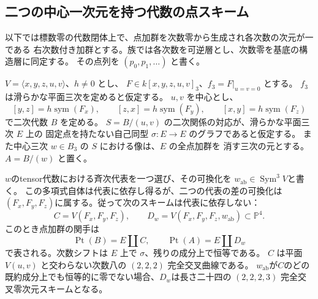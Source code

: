 \subsection{二つの中心一次元を持つ代数の点スキーム}
\label{subsec:point-central-two}

以下では標数零の代数閉体上で、点加群を次数零から生成され各次数の次元が一である
右次数付き加群とする。族では各次数を可逆層とし、次数零を基底の構造層に同定する。
その点列を $(p_0,p_1,\ldots)$ と書く。

\begin{proposition}[楕円曲線と定常点の分離]
\label{prop:central-two-point-scheme}
$V=\langle x,y,z,u,v\rangle$、$h\ne0$ とし、
$F\in k[x,y,z,u,v]_3$、$f_3=F|_{u=v=0}$ とする。
$f_3$ は滑らかな平面三次を定めると仮定する。
$u,v$ を中心とし、
\[
 [y,z]=h\operatorname{sym}(F_x),\qquad
 [z,x]=h\operatorname{sym}(F_y),\qquad
 [x,y]=h\operatorname{sym}(F_z)
\]
で二次代数 $B$ を定める。
$S=B/(u,v)$ の二次関係の対応が、滑らかな平面三次 $E$ 上の
固定点を持たない自己同型 $\sigma:E\to E$ のグラフであると仮定する。
また中心三次 $w\in B_3$ の $S$ における像は、$E$ の全点加群を
消す三次の元とする。$A=B/(w)$ と置く。

$w$のtensor代数における斉次代表を一つ選び、その可換化を
$w_{\mathrm{ab}}\in\operatorname{Sym}^3V$と書く。
この多項式自体は代表に依存し得るが、二つの代表の差の可換化は
$(F_x,F_y,F_z)$に属する。従って次のスキームは代表に依存しない：
\[
 C=V(F_x,F_y,F_z),\qquad
 D_w=V(F_x,F_y,F_z,w_{\mathrm{ab}})\subset\mathbb P^4.
\]
このとき点加群の関手は
\[
 \operatorname{Pt}(B)=E\amalg C,\qquad
 \operatorname{Pt}(A)=E\amalg D_w
\]
で表される。次数シフトは $E$ 上で $\sigma$、残りの成分上で恒等である。
$C$ は平面 $V(u,v)$ と交わらない次数八の $(2,2,2)$ 完全交叉曲線である。
$w_{\mathrm{ab}}$が$C$のどの既約成分上でも恒等的に零でない場合、$D_w$は長さ二十四の
$(2,2,2,3)$ 完全交叉零次元スキームとなる。
\end{proposition}

